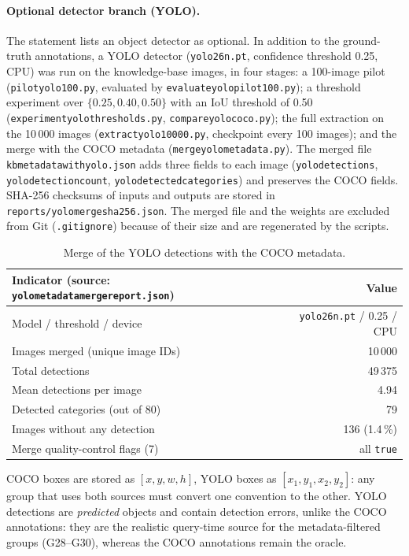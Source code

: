 \documentclass[11pt,a4paper]{article}
\renewcommand{\_}{\textunderscore\allowbreak{}}
\newcommand{\code}[1]{\texttt{#1}}
\begin{document}
\paragraph{Optional detector branch (YOLO).} The statement lists an object detector as optional. In addition to the ground-truth annotations, a YOLO detector (\code{yolo26n.pt}, confidence threshold 0.25, CPU) was run on the knowledge-base images, in four stages: a 100-image pilot (\code{pilot\_yolo\_100.py}, evaluated by \code{evaluate\_yolo\_pilot\_100.py}); a threshold experiment over $\{0.25,0.40,0.50\}$ with an IoU threshold of 0.50 (\code{experiment\_yolo\_thresholds.py}, \code{compare\_yolo\_coco.py}); the full extraction on the 10\,000 images (\code{extract\_yolo\_10000.py}, checkpoint every 100 images); and the merge with the COCO metadata (\code{merge\_yolo\_metadata.py}). The merged file \code{kb\_metadata\_with\_yolo.json} adds three fields to each image (\code{yolo\_detections}, \code{yolo\_detection\_count}, \code{yolo\_detected\_categories}) and preserves the COCO fields. SHA-256 checksums of inputs and outputs are stored in \code{reports/yolo\_merge\_sha256.json}. The merged file and the weights are excluded from Git (\code{.gitignore}) because of their size and are regenerated by the scripts.

\begin{table}[H]
\centering
\begin{tabular}{@{}lr@{}}
\toprule
\textbf{Indicator} (source: \code{yolo\_metadata\_merge\_report.json}) & \textbf{Value}\\
\midrule
Model / threshold / device & \code{yolo26n.pt} / 0.25 / CPU\\
Images merged (unique image IDs) & 10\,000\\
Total detections & 49\,375\\
Mean detections per image & 4.94\\
Detected categories (out of 80) & 79\\
Images without any detection & 136 (1.4\,\%)\\
Merge quality-control flags (7) & all \code{true}\\
\bottomrule
\end{tabular}
\caption{Merge of the YOLO detections with the COCO metadata.}
\end{table}

\begin{remark}
COCO boxes are stored as $[x,y,w,h]$, YOLO boxes as $[x_1,y_1,x_2,y_2]$: any group that uses both sources must convert one convention to the other. YOLO detections are \emph{predicted} objects and contain detection errors, unlike the COCO annotations: they are the realistic query-time source for the metadata-filtered groups (G28--G30), whereas the COCO annotations remain the oracle.
\end{remark}
\end{document}
